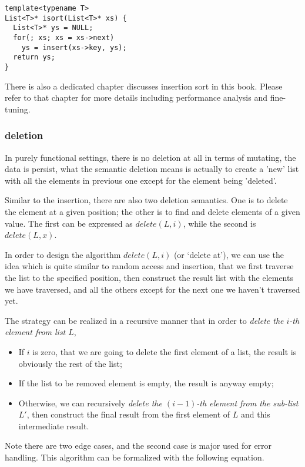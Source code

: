\documentclass{article}
\begin{document}
\lstset{language=C++}
\begin{lstlisting}
template<typename T>
List<T>* isort(List<T>* xs) {
  List<T>* ys = NULL;
  for(; xs; xs = xs->next)
    ys = insert(xs->key, ys);
  return ys;
}
\end{lstlisting}

There is also a dedicated chapter discusses insertion sort in this book. Please refer to that chapter for
more details including performance analysis and fine-tuning.

\subsubsection{deletion}
In purely functional settings, there is no deletion at all in terms of mutating, the data is persist, what
the semantic deletion means is actually to create a 'new' list with all the elements in previous one except for
the element being 'deleted'. 

Similar to the insertion, there are also two deletion semantics. One is to delete the element at a given position;
the other is to find and delete elements of a given value. The first can be expressed as $delete(L, i)$, while
the second is $delete(L, x)$.

In order to design the algorithm $delete(L,i)$ (or `delete at'), we can use the idea which is quite similar to 
random access and insertion, that we first traverse the list to the specified position, then construct the 
result list with the elements we have traversed, and all the others except for          the next one we haven't traversed yet.

The strategy can be realized in a recursive manner that in order to {\em delete the $i$-th element from list $L$},
\begin{itemize}
\item If $i$ is zero, that we are going to delete the first element of a list, the result is obviously the rest of the list;
\item If the list to be removed element is empty, the result is anyway empty;
\item Otherwise, we can recursively {\em delete the $(i-1)$-th element from the sub-list $L'$}, then construct the final
result from the first element of $L$ and this intermediate result.
\end{itemize}

Note there are two edge cases, and the second case is major used for error handling. This algorithm can be formalized
with the following equation.
\end{document}
